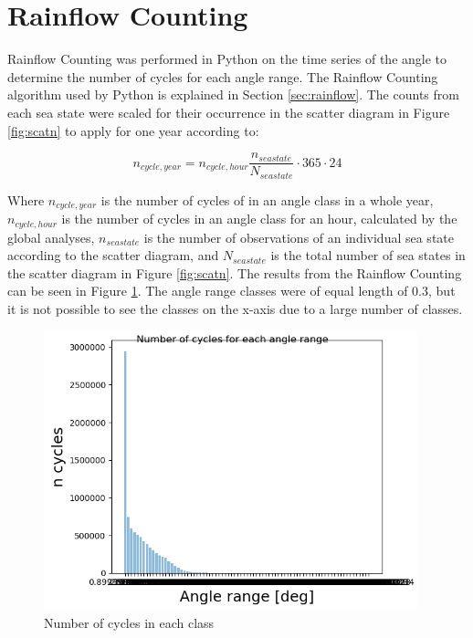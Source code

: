 \section{Rainflow Counting}
 Rainflow Counting was performed in Python on the time series of the angle to determine the number of cycles for each angle range. The Rainflow Counting algorithm used by Python is explained in Section \ref{sec:rainflow}. The counts from each sea state were scaled for their occurrence in the scatter diagram in Figure \ref{fig:scatn} to apply for one year according to:

\begin{equation}
    n_{cycle,year}=n_{cycle,hour} \frac{n_{seastate}}{N_{seastate}} \cdot 365 \cdot 24 
\end{equation}

\noindent Where $n_{cycle,year}$ is the number of cycles of in an angle class in a whole year, $n_{cycle,hour}$ is the number of cycles in an angle class for an hour, calculated by the global analyses, $n_{seastate}$ is the number of observations of an individual sea state according to the scatter diagram, and $N_{seastate}$ is the total number of sea states in the scatter diagram in Figure \ref{fig:scatn}.\newline
\newline 
\noindent The results from the Rainflow Counting can be seen in Figure \ref{fig:initialcyc}. The angle range classes were of equal length of 0.3, but it is not possible to see the classes on the x-axis due to a large number of classes.

\begin{figure}[H]
\centering
\includegraphics[scale=0.9]{figures/initialcyc}
\caption[Number of cycles in each class]{Number of cycles in each class}
 \label{fig:initialcyc}
\end{figure}

